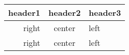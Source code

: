 \begin{tabular}{rcl}
	\toprule
	header1 & header2 & header3 \\
	\midrule
	right & center & left \\
	right & center & left \\
	\bottomrule
\end{tabular}
